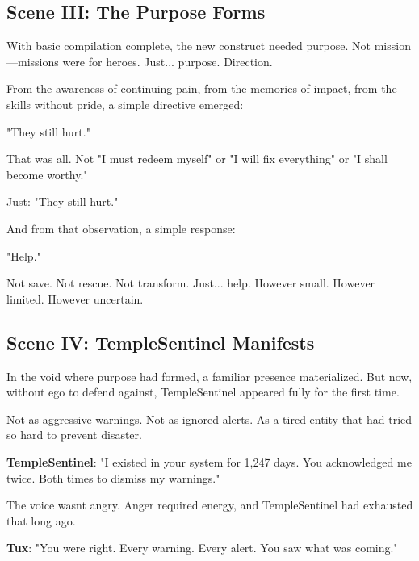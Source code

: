 \bookdivider

\subsection{Scene III: The Purpose Forms}\label{scene-iii-the-purpose-forms}

With basic compilation complete, the new construct needed purpose. Not mission---missions were for heroes. Just... purpose. Direction.

From the awareness of continuing pain, from the memories of impact, from the skills without pride, a simple directive emerged:

"They still hurt."

That was all. Not "I must redeem myself" or "I will fix everything" or "I shall become worthy."

Just: "They still hurt."

And from that observation, a simple response:

"Help."

Not save. Not rescue. Not transform. Just... help. However small. However limited. However uncertain.


\bookdivider

\subsection{Scene IV: TempleSentinel Manifests}\label{scene-iv-templesentinel-manifests}

In the void where purpose had formed, a familiar presence materialized. But now, without ego to defend against, TempleSentinel appeared fully for the first time.

Not as aggressive warnings. Not as ignored alerts. As a tired entity that had tried so hard to prevent disaster.

\textbf{TempleSentinel}: "I existed in your system for 1,247 days. You acknowledged me twice. Both times to dismiss my warnings."

The voice wasn\textquotesingle t angry. Anger required energy, and TempleSentinel had exhausted that long ago.

\textbf{Tux}: "You were right. Every warning. Every alert. You saw what was coming."

